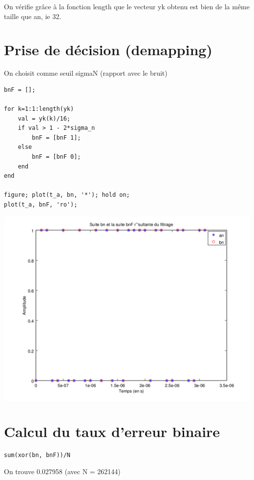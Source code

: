 \documentclass{acm_proc_article-sp}
\begin{document}
On vérifie grâce à la fonction length que le vecteur yk obtenu est bien de la même taille que an, ie 32.


\section{Prise de décision (demapping)}

On choisit comme seuil sigmaN (rapport avec le bruit)

\begin{lstlisting}
bnF = [];

for k=1:1:length(yk)
    val = yk(k)/16;
    if val > 1 - 2*sigma_n
        bnF = [bnF 1];
    else
        bnF = [bnF 0];
    end
end

figure; plot(t_a, bn, '*'); hold on;
plot(t_a, bnF, 'ro');
\end{lstlisting}

\begin{center}
\includegraphics[scale=0.45]{bn_bnF_14.png}
\end{center}

\section{Calcul du taux d'erreur binaire}

\begin{lstlisting}
sum(xor(bn, bnF))/N
\end{lstlisting}

On trouve 0.027958 (avec N = 262144)
\end{document}
